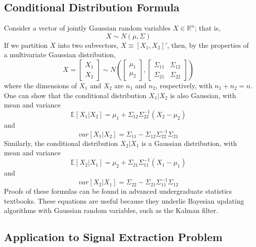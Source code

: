 \documentclass[12pt]{article}
\begin{document}
	\subsection{Conditional Distribution Formula}
		Consider a vector of jointly Gaussian random variables $X \in \mathbb{R}^n$; that is,
	\begin{equation}
		X \sim N(\mu, \Sigma)
	\end{equation}  
		If we partition $X$ into two subvectors, $X \equiv [X_1, X_2]'$, then, by the properties of a multivariate Gaussian distribution,
	\begin{equation}
		X = \begin{bmatrix}
			X_1 \\ X_2
		\end{bmatrix} \sim N\left(\begin{bmatrix}
		\mu_1 \\ \mu_2
	\end{bmatrix}, \begin{bmatrix}
	\Sigma_{11} & \Sigma_{12} \\
	\Sigma_{21} & \Sigma_{22}
\end{bmatrix}\right)
	\end{equation}
where the dimensions of $X_1$ and $X_2$ are $n_1$ and $n_2$, respectively, with $n_1 + n_2 = n$. One can show that the conditional distribution $X_1|X_2$ is also Gaussian, with mean and variance
\begin{equation}
	\mathbb{E}[X_1|X_2] = \mu_1 + \Sigma_{12} \Sigma_{22}^{-1}(X_2 - \mu_2)
\end{equation} 
and
\begin{equation}
	var[X_1|X_2] = \Sigma_{11} - \Sigma_{12} \Sigma_{22}^{-1} \Sigma_{21}
\end{equation}
Similarly, the conditional distribution $X_2|X_1$ is a Gaussian distribution, with mean and variance
\begin{equation}
	\mathbb{E}[X_2|X_1] = \mu_2 + \Sigma_{21} \Sigma_{11}^{-1}(X_1 - \mu_1)
\end{equation}
and
\begin{equation}
	var[X_2|X_1] = \Sigma_{22} - \Sigma_{21} \Sigma_{11}^{-1} \Sigma_{12}
\end{equation}
Proofs of these formulas can be found in advanced undergraduate statistics textbooks. These equations are useful because they underlie Bayesian updating algorithms with Gaussian random variables, such as the Kalman filter.  

\subsection{Application to Signal Extraction Problem}
\end{document}
